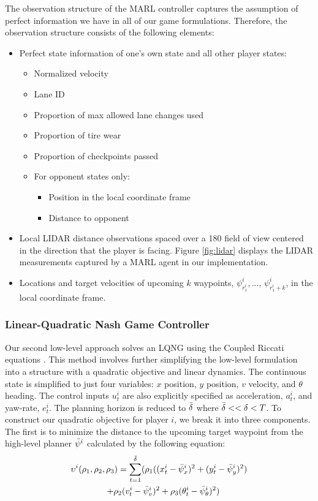 The observation structure of the MARL controller captures the assumption of perfect information we have in all of our game formulations. Therefore, the observation structure consists of the following elements:
\begin{itemize}
    \item Perfect state information of one's own state and all other player states:
    \begin{itemize}
        \item Normalized velocity
        \item Lane ID
        \item Proportion of max allowed lane changes used
        \item Proportion of tire wear
        \item Proportion of checkpoints passed
        \item For opponent states only: 
        \begin{itemize}
            \item Position in the local coordinate frame
            \item Distance to opponent
        \end{itemize}
        \end{itemize}
    \item Local LIDAR distance observations spaced over a 180\textdegree{} field of view centered in the direction that the player is facing. Figure \ref{fig:lidar} displays the LIDAR measurements captured by a MARL agent in our implementation.
    \item Locations and target velocities of upcoming $k$ waypoints, $\psi^i_{r^i_{1}}, ..., \, \psi^i_{r^i_{1} + k}$, in the local coordinate frame. 
\end{itemize}

\subsubsection{Linear-Quadratic Nash Game Controller}
Our second low-level approach solves an LQNG using the Coupled Riccati equations \cite{basar}. This method involves further simplifying the low-level formulation into a structure with a quadratic objective and linear dynamics. The continuous state is simplified to just four variables: $x$ position, $y$ position, $v$ velocity, and $\theta$ heading. The control inputs $u^i_t$ are also explicitly specified as acceleration, $a^i_t$, and yaw-rate, $e^i_t$. The planning horizon is reduced to $\Bar{\delta}$ where $\Bar{\delta} << \delta < T$. To construct our quadratic objective for player $i$, we break it into three components. The first is to minimize the distance to the upcoming target waypoint from the high-level planner $\Bar{\psi}^i$ calculated by the following equation:
\begin{multline} \label{eq:lqng_obj1}
\upsilon^i(\rho_1, \rho_2,\rho_3) =  \sum_{t = 1}^{\Bar{\delta}} (\rho_1((x^i_{t} - \Bar{\psi}^i_x)^2 + (y^i_{t} - \Bar{\psi}^i_y)^2) \\   \quad + \rho_2 (v^i_{t} - \Bar{\psi}^i_v)^2 
 + \rho_3 (\theta^i_{t} - \Bar{\psi}^i_\theta)^2)
\end{multline}

